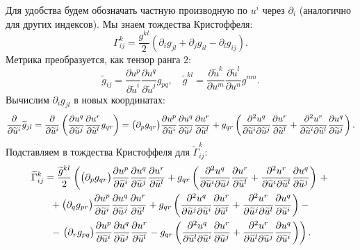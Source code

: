 \begin{solution}
	Для удобства будем обозначать частную производную по $u^i$ через $\partial_i$ (аналогично для других индексов). Мы знаем тождества Кристоффеля:
	\[
		\Gamma_{ij}^k = \frac{g^{kl}}{2}(\partial_ig_{jl} + \partial_jg_{il} - \partial_lg_{ij}).
	\]
	Метрика преобразуется, как тензор ранга $2$:
	\[
		\widetilde{g}_{ij} = \frac{\partial u^p}{\partial \widetilde{u}^i}\frac{\partial u^q}{\partial \widetilde{u}^j}g_{pq},\quad \widetilde{g}^{kl} = \frac{\partial \widetilde{u}^k}{\partial u^m}\frac{\partial \widetilde{u}^l}{\partial u^n}g^{mn}.
	\]
	Вычислим $\partial_ig_{jl}$ в новых координатах:
	\[
		\frac{\partial}{\partial \widetilde{u}^i}\widetilde{g}_{jl} = \frac{\partial}{\partial \widetilde{u}^i}\left(\frac{\partial u^q}{\partial \widetilde{u}^j}\frac{\partial u^r}{\partial \widetilde{u}^l}g_{qr}\right) = \big(\partial_pg_{qr}\big)\frac{\partial u^p}{\partial \widetilde{u}^i}\frac{\partial u^q}{\partial \widetilde{u}^j}\frac{\partial u^r}{\partial \widetilde{u}^l} + g_{qr}\left(\frac{\partial^2u^q}{\partial\widetilde{u}^i\partial\widetilde{u}^j}\frac{\partial u^r}{\partial\widetilde{u}^l} + \frac{\partial^2u^r}{\partial\widetilde{u}^i\partial\widetilde{u}^l}\frac{\partial u^q}{\partial\widetilde{u}^j}\right).
	\]
	Подставляем в тождества Кристоффеля для $\widetilde{\Gamma}_{ij}^k$:
	\begin{gather*}
		\widetilde{\Gamma}_{ij}^k = \frac{\widetilde{g}^{kl}}{2}\left(
		\big(\partial_pg_{qr}\big)\frac{\partial u^p}{\partial \widetilde{u}^i}\frac{\partial u^q}{\partial \widetilde{u}^j}\frac{\partial u^r}{\partial \widetilde{u}^l} + g_{qr}\br{\frac{\partial^2u^q}{\partial\widetilde{u}^i\partial\widetilde{u}^j}\frac{\partial u^r}{\partial\widetilde{u}^l} + \frac{\partial^2u^r}{\partial\widetilde{u}^i\partial\widetilde{u}^l}\frac{\partial u^q}{\partial\widetilde{u}^j}}\right. + {}\\
		{} + \big(\partial_qg_{pr}\big)\frac{\partial u^p}{\partial \widetilde{u}^i}\frac{\partial u^q}{\partial \widetilde{u}^j}\frac{\partial u^r}{\partial \widetilde{u}^l} + g_{qr}\br{\frac{\partial^2u^q}{\partial\widetilde{u}^j\partial\widetilde{u}^i}\frac{\partial u^r}{\partial\widetilde{u}^l} + \frac{\partial^2u^r}{\partial\widetilde{u}^j\partial\widetilde{u}^l}\frac{\partial u^q}{\partial\widetilde{u}^i}} - {}\\
		{} - \left.\big(\partial_rg_{pq}\big)\frac{\partial u^p}{\partial \widetilde{u}^i}\frac{\partial u^q}{\partial \widetilde{u}^j}\frac{\partial u^r}{\partial \widetilde{u}^l} - g_{qr}\br{\frac{\partial^2u^q}{\partial\widetilde{u}^l\partial\widetilde{u}^i}\frac{\partial u^r}{\partial\widetilde{u}^j} + \frac{\partial^2u^r}{\partial\widetilde{u}^l\partial\widetilde{u}^j}\frac{\partial u^q}{\partial\widetilde{u}^i}}\right).

\end{gather*}
\end{solution}
